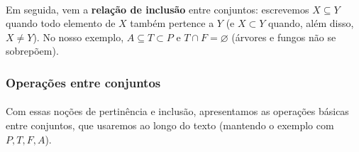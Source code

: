 \documentclass[12pt,a4paper]{article}
\begin{document}
\paragraph{}
Em seguida, vem a \textbf{relação de inclusão} entre conjuntos: escrevemos \(X \subseteq Y\) quando todo elemento de \(X\) também pertence a \(Y\) (e \(X\subset Y\) quando, além disso, \(X\neq Y\)). No nosso exemplo, \(A\subseteq T\subset P\) e \(T\cap F=\varnothing\) (árvores e fungos não se sobrepõem). 

\subsubsection{Operações entre conjuntos}
\paragraph{}
Com essas noções de pertinência e inclusão, apresentamos as operações básicas entre conjuntos, que usaremos ao longo do texto (mantendo o exemplo com \(P,T,F,A\)).
\end{document}
